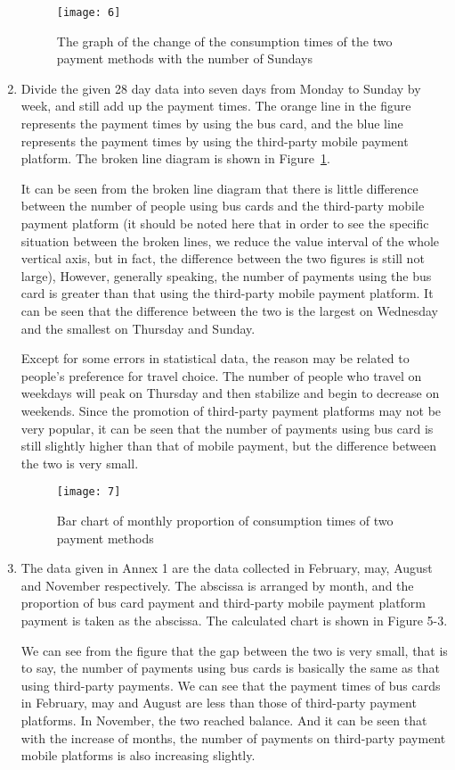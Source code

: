 \documentclass[../mcmpaper]{subfiles}
\begin{document}
\begin{enumerate}[label=\arabic*., format=\bfseries, itemindent=0pt, leftmargin=0pt, topsep=0pt, listparindent=\parindent, itemsep=1pt]
\begin{figure}[!ht]
\centering
\texttt{[image: 6]}
\caption{The graph of the change of the consumption times of the two payment methods with the number of Sundays}
\label{fig:5.2}
\end{figure}
    \item Divide the given 28 day data into seven days from Monday to Sunday by week, and still add up the payment times. The orange line in the figure represents the payment times by using the bus card, and the blue line represents the payment times by using the third-party mobile payment platform. The broken line diagram is shown in Figure~\ref{fig:5.2}.
\par
It can be seen from the broken line diagram that there is little difference between the number of people using bus cards and the third-party mobile payment platform (it should be noted here that in order to see the specific situation between the broken lines, we reduce the value interval of the whole vertical axis, but in fact, the difference between the two figures is still not large), However, generally speaking, the number of payments using the bus card is greater than that using the third-party mobile payment platform. It can be seen that the difference between the two is the largest on Wednesday and the smallest on Thursday and Sunday.
\par
Except for some errors in statistical data, the reason may be related to people's preference for travel choice. The number of people who travel on weekdays will peak on Thursday and then stabilize and begin to decrease on weekends. Since the promotion of third-party payment platforms may not be very popular, it can be seen that the number of payments using bus card is still slightly higher than that of mobile payment, but the difference between the two is very small.
\begin{figure}[!ht]
    \centering
    \texttt{[image: 7]}
    \caption{Bar chart of monthly proportion of consumption times of two payment methods}
    \label{fig:5.3}
\end{figure}
    \item The data given in Annex 1 are the data collected in February, may, August and November respectively. The abscissa is arranged by month, and the proportion of bus card payment and third-party mobile payment platform payment is taken as the abscissa. The calculated chart is shown in Figure 5-3.
\par
We can see from the figure that the gap between the two is very small, that is to say, the number of payments using bus cards is basically the same as that using third-party payments. We can see that the payment times of bus cards in February, may and August are less than those of third-party payment platforms. In November, the two reached balance. And it can be seen that with the increase of months, the number of payments on third-party payment mobile platforms is also increasing slightly.

\end{enumerate}
\end{document}
